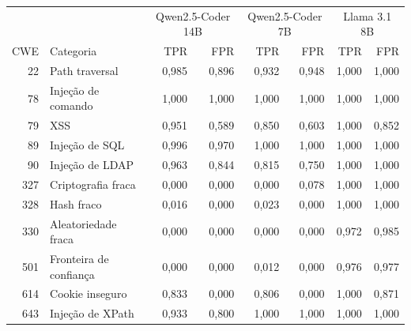 \begin{tabular}{rlrrrrrr}
\hline
 &  & \multicolumn{2}{c}{Qwen2.5-Coder 14B} & \multicolumn{2}{c}{Qwen2.5-Coder 7B} & \multicolumn{2}{c}{Llama 3.1 8B} \\
CWE & Categoria & TPR & FPR & TPR & FPR & TPR & FPR \\
\hline
22 & Path traversal & 0,985 & 0,896 & 0,932 & 0,948 & 1,000 & 1,000 \\
78 & Injeção de comando & 1,000 & 1,000 & 1,000 & 1,000 & 1,000 & 1,000 \\
79 & XSS & 0,951 & 0,589 & 0,850 & 0,603 & 1,000 & 0,852 \\
89 & Injeção de SQL & 0,996 & 0,970 & 1,000 & 1,000 & 1,000 & 1,000 \\
90 & Injeção de LDAP & 0,963 & 0,844 & 0,815 & 0,750 & 1,000 & 1,000 \\
327 & Criptografia fraca & 0,000 & 0,000 & 0,000 & 0,078 & 1,000 & 1,000 \\
328 & Hash fraco & 0,016 & 0,000 & 0,023 & 0,000 & 1,000 & 1,000 \\
330 & Aleatoriedade fraca & 0,000 & 0,000 & 0,000 & 0,000 & 0,972 & 0,985 \\
501 & Fronteira de confiança & 0,000 & 0,000 & 0,012 & 0,000 & 0,976 & 0,977 \\
614 & Cookie inseguro & 0,833 & 0,000 & 0,806 & 0,000 & 1,000 & 0,871 \\
643 & Injeção de XPath & 0,933 & 0,800 & 1,000 & 1,000 & 1,000 & 1,000 \\
\hline
\end{tabular}
